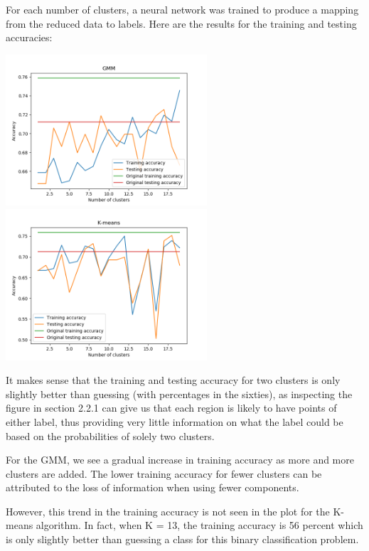\documentclass[11pt]{article}
\begin{document}
            For each number of clusters,
            a neural network was trained to produce a mapping from the reduced data
            to labels. Here are the results for the training and testing
            accuracies:

            \includegraphics[width=7.5cm]{../pima/clustering3/gmm_acc.png}
            \includegraphics[width=7.5cm]{../pima/clustering3/km_acc.png}

            It makes sense that the training and testing accuracy for two clusters is only slightly better
            than guessing (with percentages in the sixties), as inspecting the figure
            in section 2.2.1 can give us that each region is
            likely to have points of either label, thus providing very little information
            on what the label could be based on the probabilities of solely two
            clusters.

            For the GMM, we see a gradual increase in training accuracy as more and
            more clusters are added. The lower training accuracy for fewer clusters
            can be attributed to the loss of information when using fewer components.

            However, this trend in the training accuracy is not seen in the plot for
            the K-means algorithm. In fact, when K = 13, the training accuracy is
            56 percent which is only slightly better than guessing a class for this
            binary classification problem.
\end{document}
